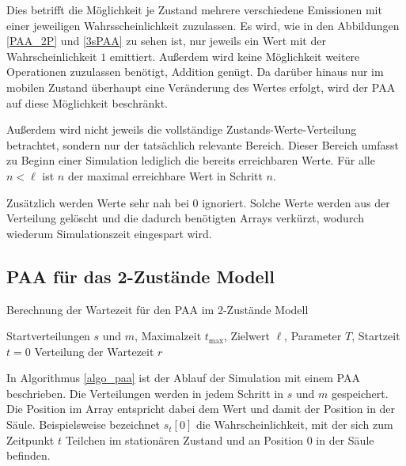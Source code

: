 Dies betrifft die Möglichkeit je Zustand mehrere verschiedene Emissionen mit einer jeweiligen Wahrsscheinlichkeit zuzulassen. Es wird, wie in den Abbildungen \ref{PAA_2P} und \ref{3sPAA} zu sehen ist, nur jeweils ein Wert mit der Wahrscheinlichkeit $1$ emittiert. Außerdem wird keine Möglichkeit weitere Operationen zuzulassen benötigt, Addition genügt. Da darüber hinaus nur im mobilen Zustand überhaupt eine Veränderung des Wertes erfolgt, wird der PAA auf diese Möglichkeit beschränkt.

Außerdem wird nicht jeweils die vollständige Zustands-Werte-Verteilung betrachtet, sondern nur der tatsächlich relevante Bereich. Dieser Bereich umfasst zu Beginn einer Simulation lediglich die bereits erreichbaren Werte. Für alle $n<\ell$ ist $n$ der maximal erreichbare Wert in Schritt $n$.

Zusätzlich werden Werte sehr nah bei $0$ ignoriert. Solche Werte werden aus der Verteilung gelöscht und die dadurch benötigten Arrays verkürzt, wodurch wiederum Simulationszeit eingespart wird.




\subsection{PAA für das 2-Zustände Modell}

\begin{algorithm}
\caption{Berechnung der Wartezeit für den PAA im 2-Zustände Modell}
\label{algo_paa}
\begin{algorithmic}[1]
\REQUIRE Startverteilungen $s$ und $m$, Maximalzeit $t_{\text{max}}$, Zielwert $\ell$, Parameter $T$, Startzeit $t=0$
\ENSURE Verteilung der Wartezeit
\ELSE
{}
\ENDIF
{}
\ENDWHILE
\RETURN $r$
\end{algorithmic}
\end{algorithm}

In Algorithmus \ref{algo_paa} ist der Ablauf der Simulation mit einem PAA beschrieben. Die Verteilungen werden in jedem Schritt in $s$ und $m$ gespeichert. Die Position im Array entspricht dabei dem Wert und damit der Position in der Säule. 
Beispielsweise bezeichnet $s_t[0]$ die Wahrscheinlichkeit, mit der sich zum Zeitpunkt $t$ Teilchen im stationären Zustand und an Position $0$ in der Säule befinden.

